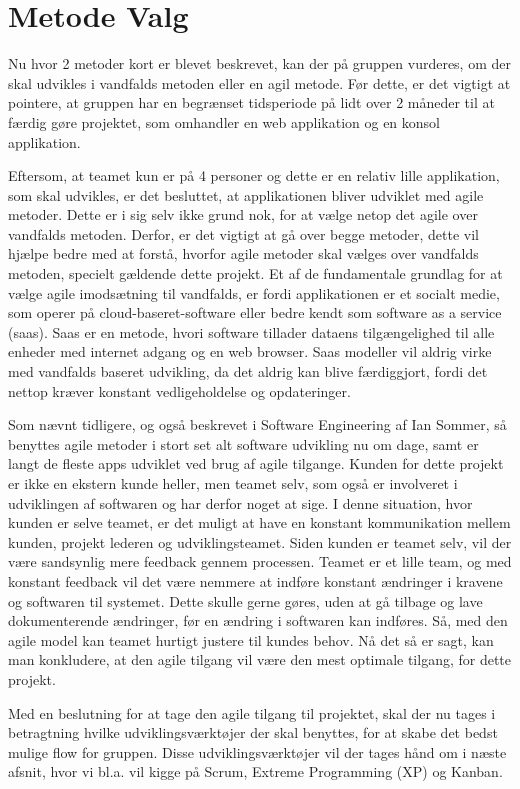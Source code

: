 \section{Metode Valg}

Nu hvor 2 metoder kort er blevet beskrevet, kan der på gruppen vurderes, om der skal udvikles i vandfalds metoden eller en agil metode. Før dette, er det vigtigt at pointere, at gruppen har en begrænset tidsperiode på lidt over 2 måneder til at færdig gøre projektet, som omhandler en web applikation og en konsol applikation.

Eftersom, at teamet kun er på 4 personer og dette er en relativ lille applikation, som skal udvikles, er det besluttet, at applikationen bliver udviklet med agile metoder. Dette er i sig selv ikke grund nok, for at vælge netop det agile over vandfalds metoden. Derfor, er det vigtigt at gå over begge metoder, dette vil hjælpe bedre med at forstå, hvorfor agile metoder skal vælges over vandfalds metoden, specielt gældende dette projekt. Et af de fundamentale grundlag for at vælge agile imodsætning til vandfalds, er fordi applikationen er et socialt medie, som operer på cloud-baseret-software eller bedre kendt som software as a service (saas). Saas er en metode, hvori software tillader dataens tilgængelighed til alle enheder med internet adgang og en web browser.\cite{SoftwareAdvice} Saas modeller vil aldrig virke med vandfalds baseret udvikling, da det aldrig kan blive færdiggjort, fordi det nettop kræver konstant vedligeholdelse og opdateringer.

Som nævnt tidligere, og også beskrevet i Software Engineering af Ian Sommer, så benyttes agile metoder i stort set alt software udvikling nu om dage, samt er langt de fleste apps udviklet ved brug af agile tilgange. \cite{Sommerville} Kunden for dette projekt er ikke en ekstern kunde heller, men teamet selv, som også er involveret i udviklingen af softwaren og har derfor noget at sige. I denne situation, hvor kunden er selve teamet, er det muligt at have en konstant kommunikation mellem kunden, projekt lederen og udviklingsteamet. Siden kunden er teamet selv, vil der være sandsynlig mere feedback gennem processen. Teamet er et lille team, og med konstant feedback vil det være nemmere at indføre konstant ændringer i kravene og softwaren til systemet. Dette skulle gerne gøres, uden at gå tilbage og lave dokumenterende ændringer, før en ændring i softwaren kan indføres. Så, med den agile model kan teamet hurtigt justere til kundes behov. Nå det så er sagt, kan man konkludere, at den agile tilgang vil være den mest optimale tilgang, for dette projekt.

Med en beslutning for at tage den agile tilgang til projektet, skal der nu tages i betragtning hvilke udviklingsværktøjer der skal benyttes, for at skabe det bedst mulige flow for gruppen. Disse udviklingsværktøjer vil der tages hånd om i næste afsnit, hvor vi bl.a. vil kigge på Scrum, Extreme Programming (XP) og Kanban.
